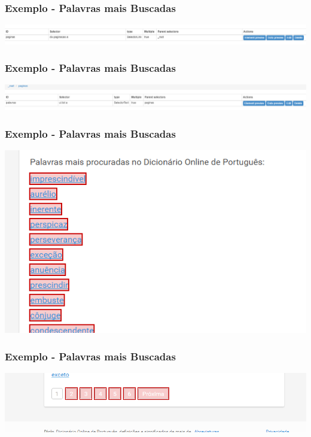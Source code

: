 \documentclass{beamer}
\begin{document}
\begin{frame}
\frametitle{Exemplo - Palavras mais Buscadas}
\includegraphics[width=\textwidth]{palavras_freq2.png}
\end{frame}

\begin{frame}
\frametitle{Exemplo - Palavras mais Buscadas}
\includegraphics[width=\textwidth]{palavras_freq3.png}
\end{frame}

\begin{frame}
\frametitle{Exemplo - Palavras mais Buscadas}
\includegraphics[width=\textwidth]{palavras_freq4.png}
\end{frame}


\begin{frame}
\frametitle{Exemplo - Palavras mais Buscadas}
\includegraphics[width=\textwidth]{palavras_freq5.png}
\end{frame}
\end{document}
